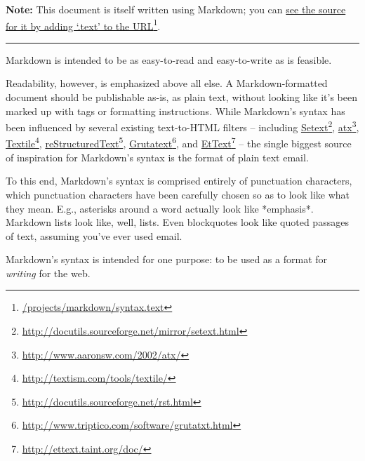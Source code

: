 \textbf{Note:} This document is itself written using Markdown; you
can \href{/projects/markdown/syntax.text}{see the source for it by adding `.text' to the URL}\footnote{\href{/projects/markdown/syntax.text}{\slash{}projects\slash{}markdown\slash{}syntax.text}}.

\begin{center}\rule{3in}{0.4pt}\end{center}

Markdown is intended to be as easy-to-read and easy-to-write as is feasible.

Readability, however, is emphasized above all else. A Markdown-formatted
document should be publishable as-is, as plain text, without looking
like it's been marked up with tags or formatting instructions. While
Markdown's syntax has been influenced by several existing text-to-HTML
filters -- including \href{http://docutils.sourceforge.net/mirror/setext.html}{Setext}\footnote{\href{http://docutils.sourceforge.net/mirror/setext.html}{http:\slash{}\slash{}docutils.sourceforge.net\slash{}mirror\slash{}setext.html}}, \href{http://www.aaronsw.com/2002/atx/}{atx}\footnote{\href{http://www.aaronsw.com/2002/atx/}{http:\slash{}\slash{}www.aaronsw.com\slash{}2002\slash{}atx\slash{}}}, \href{http://textism.com/tools/textile/}{Textile}\footnote{\href{http://textism.com/tools/textile/}{http:\slash{}\slash{}textism.com\slash{}tools\slash{}textile\slash{}}}, \href{http://docutils.sourceforge.net/rst.html}{reStructuredText}\footnote{\href{http://docutils.sourceforge.net/rst.html}{http:\slash{}\slash{}docutils.sourceforge.net\slash{}rst.html}},
\href{http://www.triptico.com/software/grutatxt.html}{Grutatext}\footnote{\href{http://www.triptico.com/software/grutatxt.html}{http:\slash{}\slash{}www.triptico.com\slash{}software\slash{}grutatxt.html}}, and \href{http://ettext.taint.org/doc/}{EtText}\footnote{\href{http://ettext.taint.org/doc/}{http:\slash{}\slash{}ettext.taint.org\slash{}doc\slash{}}} -- the single biggest source of
inspiration for Markdown's syntax is the format of plain text email.

To this end, Markdown's syntax is comprised entirely of punctuation
characters, which punctuation characters have been carefully chosen so
as to look like what they mean. E.g., asterisks around a word actually
look like *emphasis*. Markdown lists look like, well, lists. Even
blockquotes look like quoted passages of text, assuming you've ever
used email.

Markdown's syntax is intended for one purpose: to be used as a
format for \emph{writing} for the web.

